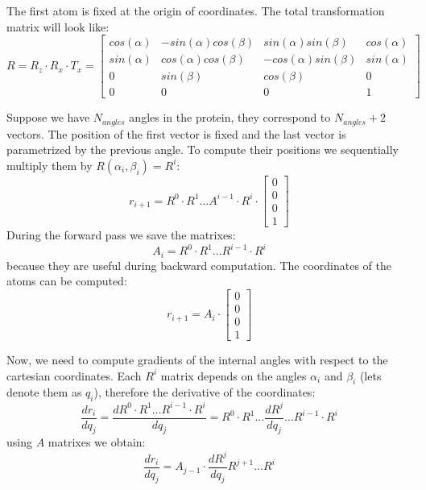 The first atom is fixed at the origin of coordinates. The total transformation matrix will look like:
$$
R = R_z \cdot R_x \cdot T_x = 
\begin{bmatrix}
cos(\alpha) & -sin(\alpha)cos(\beta) & sin(\alpha)sin(\beta) & cos(\alpha)\\
sin(\alpha) & cos(\alpha)cos(\beta) & -cos(\alpha)sin(\beta) & sin(\alpha)\\
0 & sin(\beta) & cos(\beta) & 0\\
0 & 0 & 0 & 1
\end{bmatrix} 
$$


Suppose we have $N_{angles}$ angles in the protein, they correspond to $N_{angles}+2$ vectors. The position of the first 
vector is fixed and the last vector is parametrized by the previous angle. To compute their positions we
sequentially multiply them by $R(\alpha_i, \beta_i) = R^i$:
$$ r_{i+1} = R^0 \cdot R^1 \dots A^{i-1} \cdot R^{i} \cdot \begin{bmatrix} 0 \\ 0 \\ 0 \\ 1 \end{bmatrix}$$
During the forward pass we save the matrixes:
$$A_i = R^{0} \cdot R^{1} \dots R^{i-1} \cdot R^{i}$$
because they are useful during backward computation. The coordinates of the atoms can be computed:
$$r_{i+1} = A_i \cdot \begin{bmatrix} 0 \\ 0 \\ 0 \\ 1 \end{bmatrix}$$

Now, we need to compute gradients of the internal angles with respect to the cartesian coordinates.
Each $R^{i}$ matrix depends on the angles $\alpha_i$ and $\beta_i$ (lets denote them as $q_i$), 
therefore the derivative of the coordinates:
$$ \frac{dr_i}{dq_j} = \frac{d R^{0} \cdot R^{1} \dots R^{i-1} \cdot R^{i} } {dq_j} = 
R^{0} \cdot R^{1} \dots \frac{dR^j}{dq_j} \dots R^{i-1} \cdot R^{i} $$
using $A$ matrixes we obtain:
$$ \frac{dr_i}{dq_j} = A_{j-1}  \cdot \frac{dR^j}{dq_j} R^{j+1} \dots R^{i} $$


